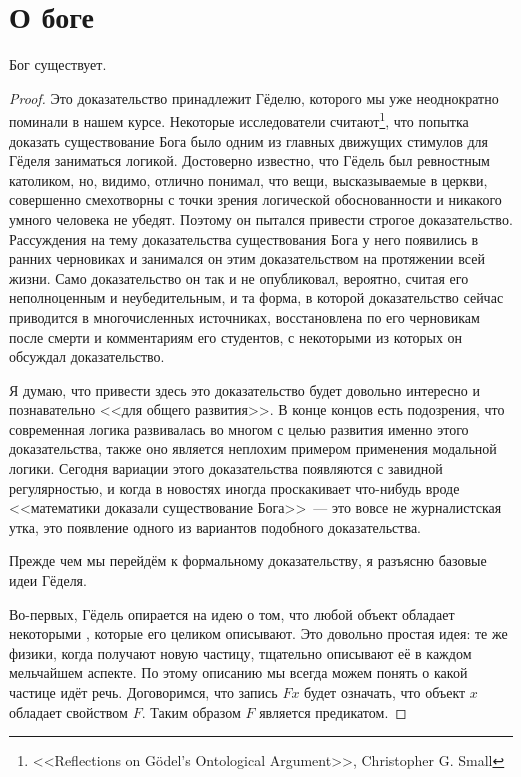 \section{О боге}

\begin{thm}
Бог существует.
\end{thm}
\begin{proof}
Это доказательство принадлежит Гёделю, которого мы уже неоднократно поминали в нашем курсе. Некоторые исследователи считают\footnote{<<Reflections on Gödel’s Ontological Argument>>, Christopher G. Small}, что попытка доказать существование Бога было одним из главных движущих стимулов для Гёделя заниматься логикой. Достоверно известно, что Гёдель был ревностным католиком, но, видимо, отлично понимал, что вещи, высказываемые в церкви, совершенно смехотворны с точки зрения логической обоснованности и никакого умного человека не убедят. Поэтому он пытался привести строгое доказательство. Рассуждения на тему доказательства существования Бога у него появились в ранних черновиках и занимался он этим доказательством на протяжении всей жизни. Само доказательство он так и не опубликовал, вероятно, считая его неполноценным и неубедительным, и та форма, в которой доказательство сейчас приводится в многочисленных источниках, восстановлена по его черновикам после смерти и комментариям его студентов, с некоторыми из которых он обсуждал доказательство.

Я думаю, что привести здесь это доказательство будет довольно интересно и познавательно <<для общего развития>>. В конце концов есть подозрения, что современная логика развивалась во многом с целью развития именно этого доказательства, также оно является неплохим примером применения модальной логики. Сегодня вариации этого доказательства появляются с завидной регулярностью, и когда в новостях иногда проскакивает что-нибудь вроде <<математики доказали существование Бога>>~--- это вовсе не журналистская утка, это появление одного из вариантов подобного доказательства.

Прежде чем мы перейдём к формальному доказательству, я разъясню базовые идеи Гёделя.

Во-первых, Гёдель опирается на идею о том, что любой объект обладает некоторыми , которые его целиком описывают. Это довольно простая идея: те же физики, когда получают новую частицу, тщательно описывают её в каждом мельчайшем аспекте. По этому описанию мы всегда можем понять о какой частице идёт речь. Договоримся, что запись $Fx$ будет означать, что объект $x$ обладает свойством $F$. Таким образом $F$ является предикатом.


\end{proof}

